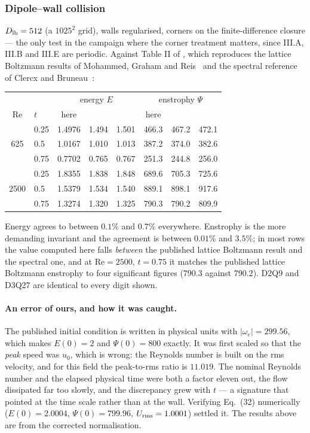\documentclass[11pt,a4paper]{article}
\begin{document}
\subsubsection{Dipole--wall collision}

$D_{\rm lb}=512$ (a $1025^2$ grid), walls regularised, corners on the
finite-difference closure --- the only test in the campaign where the corner
treatment matters, since III.A, III.B and III.E are periodic. Against Table II
of \cite{derosis2020}, which reproduces the lattice Boltzmann results of
Mohammed, Graham and Reis~\cite{mohammed2018} and the spectral reference of
Clercx and Bruneau~\cite{clercx2006}:

\begin{center}\small
\begin{tabular}{clccc|ccc}
\toprule
 & & \multicolumn{3}{c|}{energy $E$} & \multicolumn{3}{c}{enstrophy $\Psi$} \\
$\mathrm{Re}$ & $t$ & here & \cite{mohammed2018} & \cite{clercx2006}
              & here & \cite{mohammed2018} & \cite{clercx2006} \\
\midrule
     & 0.25 & 1.4976 & 1.494 & 1.501 & 466.3 & 467.2 & 472.1 \\
625  & 0.5  & 1.0167 & 1.010 & 1.013 & 387.2 & 374.0 & 382.6 \\
     & 0.75 & 0.7702 & 0.765 & 0.767 & 251.3 & 244.8 & 256.0 \\
\midrule
     & 0.25 & 1.8355 & 1.838 & 1.848 & 689.6 & 705.3 & 725.6 \\
2500 & 0.5  & 1.5379 & 1.534 & 1.540 & 889.1 & 898.1 & 917.6 \\
     & 0.75 & 1.3274 & 1.320 & 1.325 & 790.3 & 790.2 & 809.9 \\
\bottomrule
\end{tabular}
\end{center}

\noindent Energy agrees to between $0.1\%$ and $0.7\%$ everywhere. Enstrophy is
the more demanding invariant and the agreement is between $0.01\%$ and $3.5\%$;
in most rows the value computed here falls \emph{between} the published lattice
Boltzmann result and the spectral one, and at $\mathrm{Re}=2500$, $t=0.75$ it
matches the published lattice Boltzmann enstrophy to four significant figures
($790.3$ against $790.2$). D2Q9 and D3Q27 are identical to every digit shown.

\paragraph{An error of ours, and how it was caught.} The published initial
condition is written in physical units with $|\omega_e| = 299.56$, which makes
$E(0)=2$ and $\Psi(0)=800$ exactly. It was first scaled so that the \emph{peak}
speed was $u_0$, which is wrong: the Reynolds number is built on the rms
velocity, and for this field the peak-to-rms ratio is $11.019$. The nominal
Reynolds number and the elapsed physical time were both a factor eleven out, the
flow dissipated far too slowly, and the discrepancy grew with $t$ --- a
signature that pointed at the time scale rather than at the wall. Verifying
Eq.~(32) numerically ($E(0)=2.0004$, $\Psi(0)=799.96$, $U_{\rm rms}=1.0001$)
settled it. The results above are from the corrected normalisation.
\end{document}
